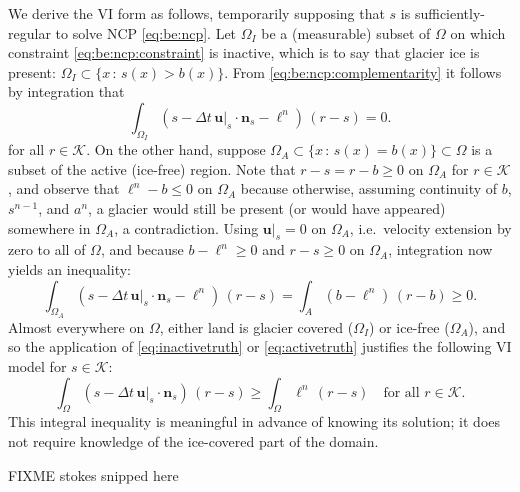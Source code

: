 \documentclass[hidelinks,onefignum,onetabnum,final]{siamart220329}  %
\newcommand{\bn}{\mathbf{n}}
\newcommand{\bu}{\mathbf{u}}
\newcommand{\cK}{\mathcal{K}}
\begin{document}
We derive the VI form \cite{Bueler2021conservation} as follows, temporarily supposing that $s$ is sufficiently-regular to solve NCP \eqref{eq:be:ncp}.  Let $\Omega_I$ be a (measurable) subset of $\Omega$ on which constraint \eqref{eq:be:ncp:constraint} is inactive, which is to say that glacier ice is present: $\Omega_I \subset \{x\,:\,s(x)>b(x)\}$.  From \eqref{eq:be:ncp:complementarity} it follows by integration that
\begin{equation}
\int_{\Omega_I} \left(s - \Delta t\,\bu|_s \cdot \bn_s - \ell^n\right)\,(r-s) = 0.  \label{eq:inactivetruth}
\end{equation}
for all $r\in\cK$.  On the other hand, suppose $\Omega_A \subset \{x\,:\,s(x)=b(x)\} \subset \Omega$ is a subset of the active (ice-free) region.  Note that $r-s=r-b\ge 0$ on $\Omega_A$ for $r\in\cK$, and observe that $\ell^n - b \le 0$ on $\Omega_A$ because otherwise, assuming continuity of $b$, $s^{n-1}$, and $a^n$, a glacier would still be present (or would have appeared) somewhere in $\Omega_A$, a contradiction.  Using $\bu|_s=0$ on $\Omega_A$, i.e.~velocity extension by zero to all of $\Omega$, and because $b-\ell^n \ge 0$ and $r-s\ge 0$ on $\Omega_A$, integration now yields an inequality:
\begin{equation}
\int_{\Omega_A} \left(s - \Delta t\,\bu|_s \cdot \bn_s - \ell^n\right)\,(r-s) = \int_A \left(b - \ell^n\right)\,(r-b) \ge 0.  \label{eq:activetruth}
\end{equation}
Almost everywhere on $\Omega$, either land is glacier covered ($\Omega_I$) or ice-free ($\Omega_A$), and so the application of \eqref{eq:inactivetruth} or \eqref{eq:activetruth} justifies the following VI model for $s \in \cK$:
\begin{equation}
\int_\Omega \left(s - \Delta t\,\bu|_s \cdot \bn_s\right)\,(r-s) \ge \int_\Omega \ell^n \,(r-s) \quad \text{for all } r \in \cK. \label{eq:be:viearly}
\end{equation}
This integral inequality is meaningful in advance of knowing its solution; it does not require knowledge of the ice-covered part of the domain.
	
FIXME stokes snipped here
\end{document}
